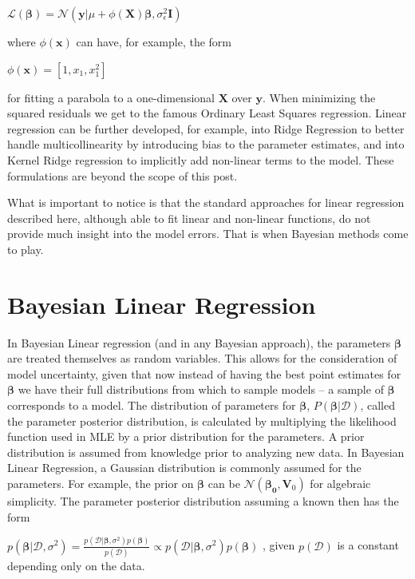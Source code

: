\documentclass[]{article}
\begin{document}
$\mathcal{L}(\boldsymbol{\beta}) = \mathcal{N}(\boldsymbol{y}|\mu + \phi(\boldsymbol{X})\boldsymbol{\beta},\sigma_{\epsilon}^2\boldsymbol{I})$

where $\phi(\boldsymbol{x})$ can have, for example, the form

$\phi(\boldsymbol{x})=[1, x_1, x_1^2]$

for fitting a parabola to a one-dimensional $\boldsymbol{X}$ over $\boldsymbol{y}$. When minimizing the squared residuals we get to the famous Ordinary Least Squares regression. Linear regression can be further developed, for example, into Ridge Regression to better handle multicollinearity by introducing bias to the parameter estimates, and into Kernel Ridge regression to implicitly add non-linear terms to the model. These formulations are beyond the scope of this post.

What is important to notice is that the standard approaches for linear regression described here, although able to fit linear and non-linear functions, do not provide much insight into the model errors. That is when Bayesian methods come to play.

\section{Bayesian Linear Regression}

In Bayesian Linear regression (and in any Bayesian approach), the parameters $\boldsymbol{\beta}$ are treated themselves as random variables. This allows for the consideration of model uncertainty, given that now instead of having the best point estimates for $\boldsymbol{\beta}$ we have their full distributions from which to sample models – a sample of  $\boldsymbol{\beta}$ corresponds to a model. The distribution of parameters for $\boldsymbol{\beta}$, $P(\boldsymbol{\beta}|\mathcal{D})$, called the parameter posterior distribution, is calculated by multiplying the likelihood function used in MLE by a prior distribution for the parameters. A prior distribution is assumed from knowledge prior to analyzing new data. In Bayesian Linear Regression, a Gaussian distribution is commonly assumed for the parameters. For example, the prior on $\boldsymbol{\beta}$ can be $\mathcal{N}(\boldsymbol{\beta_0},\boldsymbol{V}_0)$ for algebraic simplicity. The parameter posterior distribution assuming a known  then has the form

$p(\boldsymbol{\beta}|\mathcal{D}, \sigma^2) =\frac{p(\mathcal{D}|\boldsymbol{\beta}, \sigma^2)p(\boldsymbol{\beta})}{p(\mathcal{D})} \propto p(\mathcal{D}|\boldsymbol{\beta}, \sigma^2)p(\boldsymbol{\beta})$  ,        given $p(\mathcal{D})$ is a constant depending only on the data.
\end{document}
